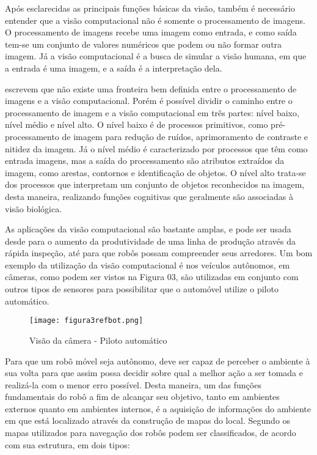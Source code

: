 Após esclarecidas as principais funções básicas da visão, também é necessário entender que a visão computacional não é somente o processamento de imagens. O processamento de imagens recebe uma imagem como entrada, e como saída tem-se um conjunto de valores numéricos que podem ou não formar outra imagem. Já a visão computacional é a busca de simular a visão humana, em que a entrada é uma imagem, e a saída é a interpretação dela. 

\cite{gonzalez} escrevem que não existe uma fronteira bem definida entre o processamento de imagens e a visão computacional. Porém é possível dividir o caminho entre o processamento de imagem e a visão computacional em três partes: nível baixo, nível médio e nível alto. O nível baixo é de processos primitivos, como pré-processamento de imagem para redução de ruídos, aprimoramento de contraste e nitidez da imagem. Já o nível médio é caracterizado por processos que têm como entrada imagens, mas a saída do processamento são atributos extraídos da imagem, como arestas, contornos e identificação de objetos. O nível alto trata-se dos processos que interpretam um conjunto de objetos reconhecidos na imagem, desta maneira, realizando funções cognitivas que geralmente são associadas à visão biológica.

As aplicações da visão computacional são bastante amplas, e pode ser usada desde para o aumento da produtividade de uma linha de produção através da rápida inspeção, até para que robôs possam compreender seus arredores. Um bom exemplo da utilização da visão computacional é nos veículos autônomos, em câmeras, como podem ser vistos na Figura 03, são utilizadas em conjunto com outros tipos de sensores para possibilitar que o automóvel utilize o piloto automático. 

\begin{figure}[h!]												
	\centering												
	\texttt{[image: figura3refbot.png]}			
	\caption{Visão da câmera - Piloto automático}		
	\label{img:denavit}	
\end{figure}

Para que um robô móvel seja autônomo, deve ser capaz de perceber o ambiente à sua volta para que assim possa decidir sobre qual a melhor ação a ser tomada e realizá-la com o menor erro possível. Desta maneira, um das funções fundamentais do robô a fim de alcançar seu objetivo, tanto em ambientes externos quanto em ambientes internos, é a aquisição de informações do ambiente em que está localizado através da construção de mapas do local. Segundo \cite{murphy} os mapas utilizados para navegação dos robôs podem ser classificados, de acordo com sua estrutura, em dois tipos:

